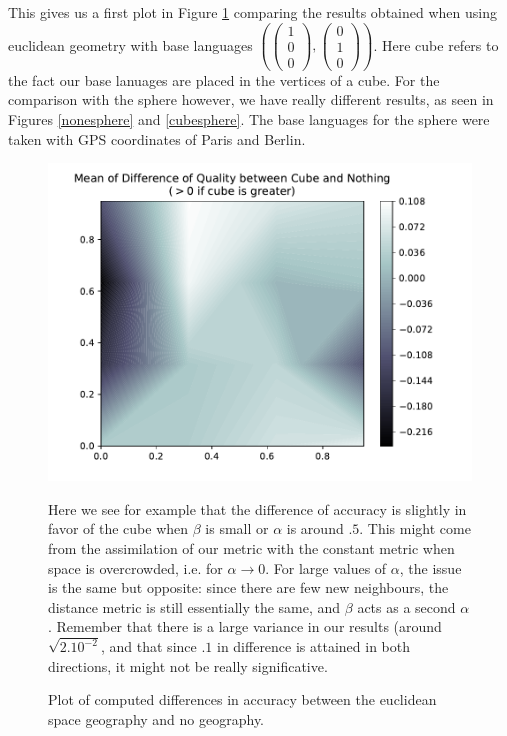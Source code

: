 \documentclass[math, info, english]{cours}
\begin{document}
This gives us a first plot in Figure \ref{cubenone} comparing the results obtained when using euclidean geometry with base languages $\left( \begin{pmatrix}
	1\\
	0\\
	0
\end{pmatrix}, \begin{pmatrix}
	0\\
	1\\
	0
\end{pmatrix}\right)$. Here cube refers to the fact our base lanuages are placed in the vertices of a cube.
For the comparison with the sphere however, we have really different results, as seen in Figures \ref{nonesphere} and \ref{cubesphere}. The base languages for the sphere were taken with GPS coordinates of Paris and Berlin.

\begin{figure}[H]
	\centering
	\hfill
	\begin{minipage}{.45\textwidth}
	\includegraphics[width=\textwidth]{../Figures/qual_diff_cube_none}
	\caption{Plot of computed differences in accuracy between the euclidean space geography and no geography.}
	\label{cubenone}
\end{minipage}
\hfill
\begin{minipage}{.35\textwidth}
Here we see for example that the difference of accuracy is slightly in favor of the cube when $\beta$ is small or $\alpha$ is around $.5$.
This might come from the assimilation of our metric with the constant metric when space is overcrowded, i.e. for $\alpha \to 0$.
For large values of $\alpha$, the issue is the same but opposite: since there are few new neighbours, the distance metric is still essentially the same, and $\beta$ acts as a second $\alpha$.
Remember that there is a large variance in our results (around $\sqrt{2.10^{-2}}$, and that since $.1$ in difference is attained in both directions, it might not be really significative.
\end{minipage}
\hfill
\end{figure}
\end{document}
